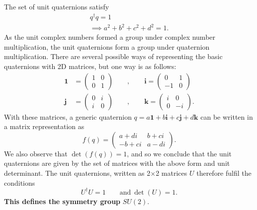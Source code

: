 \documentclass[11pt]{article}
\numberwithin{equation}{section}
\begin{document}
The set of unit quaternions satisfy
\begin{align}
q^\dagger q = 1 \\
\implies a^2 + b^2 + c^2 + d^2 = 1.
\end{align}
As the unit complex numbers formed a group under complex number multiplication, the unit quaternions form a group under quaternion multiplication. There are several possible ways of representing the basic quaternions with 2D matrices, but one way is as follows:
\begin{align}
\mathbf{1}&=\begin{pmatrix}
1&0\\
0&1
\end{pmatrix}\qquad,\qquad
\mathbf{i}=\begin{pmatrix}
0&1\\
-1&0
\end{pmatrix} \nonumber \\
\mathbf{j}&=\begin{pmatrix}
0&i\\
i&0
\end{pmatrix}\qquad,\qquad
\mathbf{k}=\begin{pmatrix}
i&0\\
0&-i
\end{pmatrix}. \label{eq:matrix-repn-quaternion}
\end{align}
With these matrices, a generic quaternion $q=a\mathbf{1}+b\mathbf{i}+c\mathbf{j}+d\mathbf{k}$ can be written in a matrix representation as
\begin{equation}
f(q) = \begin{pmatrix}
a+di & b + ci\\
-b + ci & a-di
\end{pmatrix}. \label{eq:quaternion-matrix-repn}
\end{equation}
We also observe that $\det(f(q))=1$, and so we conclude that the unit quaternions are given by the set of matrices with the above form and unit determinant. The unit quaternions, written as 2$\times$2 matrices $U$ therefore fulfil the conditions
\begin{equation}
U^\dagger U=1 \qquad \text{and}\ \det(U)=1. \label{eq:defn-su2}
\end{equation}
\textbf{This defines the symmetry group} $SU(2)$. 
\end{document}
